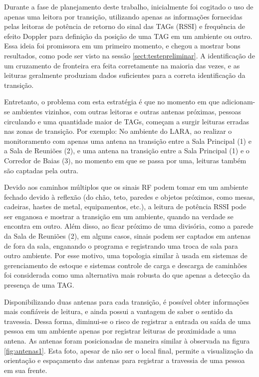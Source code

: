  Durante a fase de planejamento deste trabalho, inicialmente foi cogitado o uso de apenas uma leitora por transição, utilizando apenas as informações fornecidas pelas leitoras de potência de retorno do sinal das TAGs (RSSI) e frequência de efeito Doppler para definição da posição de uma TAG em um ambiente ou outro. Essa ideia foi promissora em um primeiro momento, e chegou a mostrar bons resultados, como pode ser visto na sessão \ref{sect:testepreliminar}. A identificação de um cruzamento de fronteira era feita corretamente na maioria das vezes, e as leituras geralmente produziam dados suficientes para a correta identificação da transição.
 
 Entretanto, o problema com esta estratégia é que no momento em que adicionam-se ambientes vizinhos, com outras leitoras e outras antenas próximas, pessoas circulando e uma quantidade maior de TAGs, começam a surgir leituras erradas nas zonas de transição. Por exemplo: No ambiente do LARA, ao realizar o monitoramento com apenas uma antena na transição entre a Sala Principal (1) e a Sala de Reuniões (2), e uma antena na transição entre a Sala Principal (1) e o Corredor de Baias (3), no momento em que se passa por uma, leituras também são captadas pela outra. 
 
 Devido aos caminhos múltiplos que os sinais RF podem tomar em um ambiente fechado devido à reflexão (do chão, teto, paredes e objetos próximos, como mesas, cadeiras, hastes de metal, equipamentos, etc.), a leitura de potência RSSI pode ser enganosa e mostrar a transição em um ambiente, quando na verdade se encontra em outro. Além disso, ao ficar próximo de uma divisória, como a parede da Sala de Reuniões (2), em alguns casos, sinais podem ser captados em antenas de fora da sala, enganando o programa e registrando uma troca de sala para outro ambiente. Por esse motivo, uma topologia similar à usada em sistemas de gerenciamento de estoque e sistemas  controle de carga e descarga de caminhões \cite{PortalRFID} foi considerada como uma alternativa mais robusta do que apenas a detecção da presença de uma TAG.
 
 Disponibilizando duas antenas para cada transição, é possível obter informações mais confiáveis de leitura, e ainda possui a vantagem de saber o sentido da travessia. Dessa forma, diminui-se o risco de registrar a entrada ou saída de uma pessoa em um ambiente apenas por registrar leituras de proximidade a uma antena. As antenas foram posicionadas de maneira similar à observada na figura \ref{fig:antenas1}. Esta foto, apesar de não ser o local final, permite a visualização da orientação e espaçamento das antenas para registrar a travessia de uma pessoa em sua frente.
 
